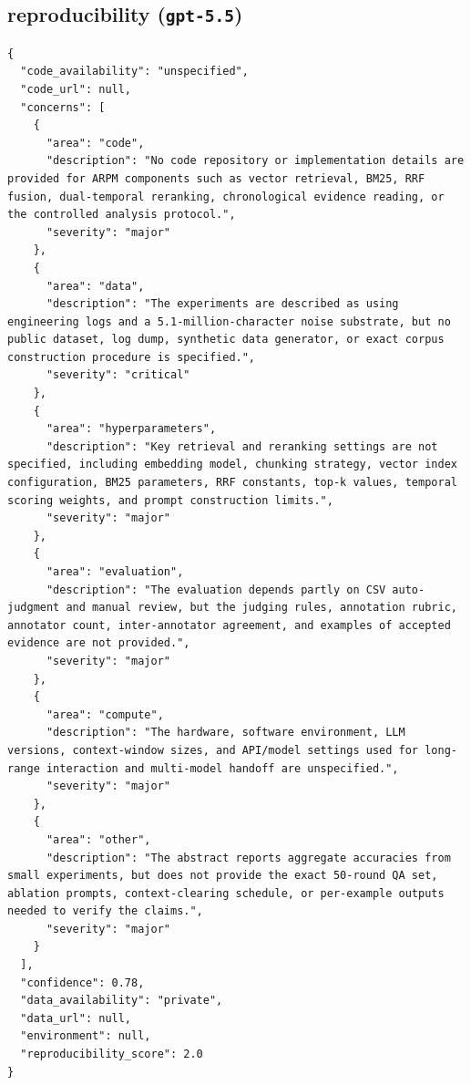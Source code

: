 \documentclass[11pt]{article}
\begin{document}
\subsection*{reproducibility (\texttt{gpt-5.5})}
\begin{verbatim}
{
  "code_availability": "unspecified",
  "code_url": null,
  "concerns": [
    {
      "area": "code",
      "description": "No code repository or implementation details are provided for ARPM components such as vector retrieval, BM25, RRF fusion, dual-temporal reranking, chronological evidence reading, or the controlled analysis protocol.",
      "severity": "major"
    },
    {
      "area": "data",
      "description": "The experiments are described as using engineering logs and a 5.1-million-character noise substrate, but no public dataset, log dump, synthetic data generator, or exact corpus construction procedure is specified.",
      "severity": "critical"
    },
    {
      "area": "hyperparameters",
      "description": "Key retrieval and reranking settings are not specified, including embedding model, chunking strategy, vector index configuration, BM25 parameters, RRF constants, top-k values, temporal scoring weights, and prompt construction limits.",
      "severity": "major"
    },
    {
      "area": "evaluation",
      "description": "The evaluation depends partly on CSV auto-judgment and manual review, but the judging rules, annotation rubric, annotator count, inter-annotator agreement, and examples of accepted evidence are not provided.",
      "severity": "major"
    },
    {
      "area": "compute",
      "description": "The hardware, software environment, LLM versions, context-window sizes, and API/model settings used for long-range interaction and multi-model handoff are unspecified.",
      "severity": "major"
    },
    {
      "area": "other",
      "description": "The abstract reports aggregate accuracies from small experiments, but does not provide the exact 50-round QA set, ablation prompts, context-clearing schedule, or per-example outputs needed to verify the claims.",
      "severity": "major"
    }
  ],
  "confidence": 0.78,
  "data_availability": "private",
  "data_url": null,
  "environment": null,
  "reproducibility_score": 2.0
}
\end{verbatim}
\end{document}
